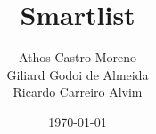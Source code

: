 \documentclass{beamer}
\title{Smartlist}
\author[Athos, Giliard e Ricardo]{Athos Castro Moreno\\{Giliard Godoi de Almeida}\\{Ricardo Carreiro Alvim}}
\institute{Universidade Tecnológica Federal do Paraná}
\date{\today}
\begin{document}
	\begin{frame}
		\titlepage
	\end{frame}
	
	
	
	
	
	
	
	
\end{document}
